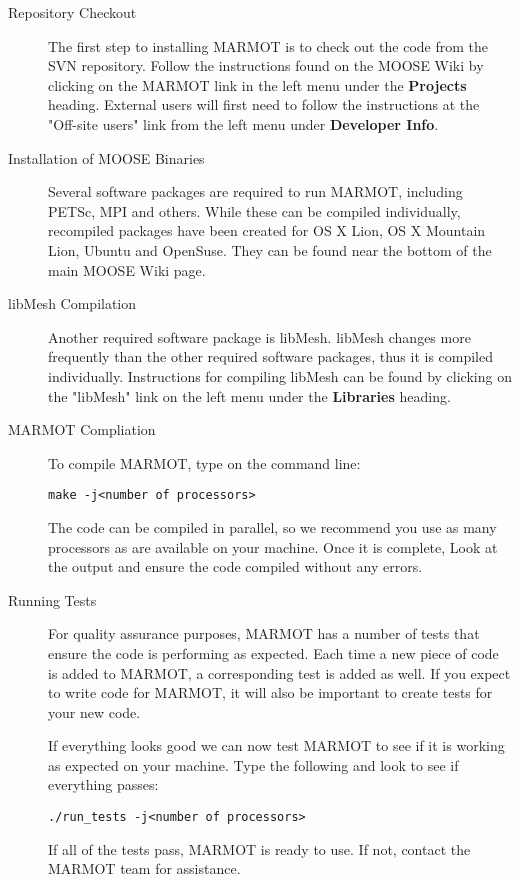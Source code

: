 \documentclass[letter,12pt,fleqn]{article}
\begin{document}
\begin{description}
\item[ Repository Checkout]  
The first step to installing MARMOT is to check out the code from the SVN repository. Follow the instructions found on the MOOSE Wiki by clicking on the MARMOT link in the left menu under the {\bf Projects} heading. External users will first need to follow the instructions at the "Off-site users" link from the left menu under {\bf Developer Info}.

\item[Installation of MOOSE Binaries] 
Several software packages are required to run MARMOT, including PETSc, MPI and others. While these can be compiled individually, recompiled packages have been created for OS X Lion, OS X Mountain Lion, Ubuntu and OpenSuse. They can be found near the bottom of the main MOOSE Wiki page.

\item[libMesh Compilation]
Another required software package is libMesh. libMesh changes more frequently than the other required software packages, thus it is compiled individually. Instructions for compiling libMesh can be found by clicking on the "libMesh" link on the left menu under the {\bf Libraries} heading.

\item[MARMOT Compliation]
To compile MARMOT, type on the command line:

\texttt{make -j<number of processors>}

The code can be compiled in parallel, so we recommend you use as many processors as are available on your machine. Once it is complete, Look at the output and ensure the code compiled without any errors. 

\item[Running Tests]
For quality assurance purposes, MARMOT has a number of tests that ensure the code is performing as expected. Each time a new piece of code is added to MARMOT, a corresponding test is added as well. If you expect to write code for MARMOT, it will also be important to create tests for your new code.

If everything looks good we can now test MARMOT to see if it is working as expected on your machine. Type the following and look to see if everything passes:

\vspace{5mm}

\texttt{./run\_tests -j<number of processors>}

\vspace{5mm}

If all of the tests pass, MARMOT is ready to use. If not, contact the MARMOT team for assistance.

\end{description} 
\end{document}
